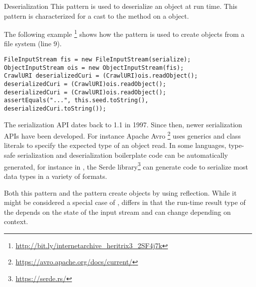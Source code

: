 \begin{pattern}{Deserialization}
This pattern is used to deserialize an object at run time.
This pattern is characterized for a cast to the  method on a  object.

\instances{}
The following example%
\footnote{\url{http://bit.ly/internetarchive_heritrix3_2SF4j7k}}
shows how the \thisp{} pattern is used to create objects from a file system (line 9).

\begin{verbatim}
FileInputStream fis = new FileInputStream(serialize);
ObjectInputStream ois = new ObjectInputStream(fis);
CrawlURI deserializedCuri = (CrawlURI)ois.readObject();
deserializedCuri = (CrawlURI)ois.readObject();
deserializedCuri = (CrawlURI)ois.readObject();
assertEquals("...", this.seed.toString(), deserializedCuri.toString());
\end{verbatim}

\discussion{}
  The serialization API dates back to \java{} 1.1 in 1997.
  Since then, newer serialization APIs have been developed.
  For instance Apache Avro%
  \footnote{\url{https://avro.apache.org/docs/current/}}
  uses generics and class literals to specify the expected type of an object
  read. 
  In some languages, type-safe serialization and deserialization 
  boilerplate code can be automatically generated, for instance
  in \rust{}, the Serde library\footnote{\url{https://serde.rs/}}
  can generate code to serialize most data types
  in a variety of formats.

Both this pattern and the  pattern create objects by using reflection.
While it might be considered a special case of , \thisp{} differs
  in that the run-time result type of the  depends on
  the state of the input stream and can change depending on context.
 
\end{pattern}
